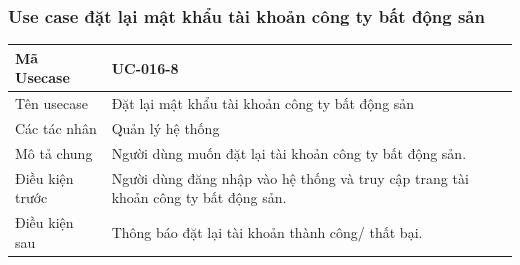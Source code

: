\documentclass[12pt,a4paper]{article}
\begin{document}
\begin{table}[H]
    \end{table}


    \subsubsection*{Use case đặt lại mật khẩu tài khoản công ty bất động sản}
    \begin{table}[H]
        \centering
        \begin{tabular}{|p{3.5cm}|p{11.5cm}|c|}
            \hline
            Mã Usecase      & UC-016-8                                                                            \\
            \hline
            Tên usecase     & Đặt lại mật khẩu tài khoản công ty bất động sản                                     \\
            \hline
            Các tác nhân    & Quản lý hệ thống                                                                    \\
            \hline
            Mô tả chung     & Người dùng muốn đặt lại tài khoản công ty bất động sản.                             \\
            \hline

            Điều kiện trước & Người dùng đăng nhập vào hệ thống và truy cập trang tài khoản công ty bất động sản. \\
            \hline

            Điều kiện sau   & Thông báo đặt lại tài khoản thành công/ thất bại.                                   \\
            \hline


\end{tabular}
\end{table}
\end{document}
